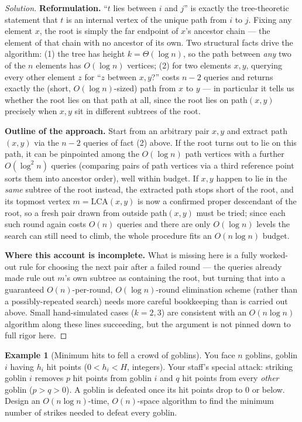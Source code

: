 \documentclass[11pt]{article}
\theoremstyle{definition}
\newtheorem{example}{Example}[section]
\begin{document}
\begin{proof}[Solution]
\textbf{Reformulation.} ``$t$ lies between $i$ and $j$'' is exactly the tree-theoretic statement that $t$ is an internal vertex of the unique path from $i$ to $j$. Fixing any element $x$, the root is simply the far endpoint of $x$'s ancestor chain — the element of that chain with no ancestor of its own. Two structural facts drive the algorithm: (1) the tree has height $k=\Theta(\log n)$, so the path between \emph{any} two of the $n$ elements has $O(\log n)$ vertices; (2) for two elements $x,y$, querying every other element $z$ for ``$z$ between $x,y$?'' costs $n-2$ queries and returns exactly the (short, $O(\log n)$-sized) path from $x$ to $y$ — in particular it tells us whether the root lies on that path at all, since the root lies on path$(x,y)$ precisely when $x,y$ sit in different subtrees of the root.

\textbf{Outline of the approach.} Start from an arbitrary pair $x,y$ and extract path$(x,y)$ via the $n-2$ queries of fact (2) above. If the root turns out to lie on this path, it can be pinpointed among the $O(\log n)$ path vertices with a further $O(\log^2 n)$ queries (comparing pairs of path vertices via a third reference point sorts them into ancestor order), well within budget. If $x,y$ happen to lie in the \emph{same} subtree of the root instead, the extracted path stops short of the root, and its topmost vertex $m=\mathrm{LCA}(x,y)$ is now a confirmed proper descendant of the root, so a fresh pair drawn from outside path$(x,y)$ must be tried; since each such round again costs $O(n)$ queries and there are only $O(\log n)$ levels the search can still need to climb, the whole procedure fits an $O(n\log n)$ budget.

\textbf{Where this account is incomplete.} What is missing here is a fully worked-out rule for choosing the next pair after a failed round — the queries already made rule out $m$'s own subtree as containing the root, but turning that into a guaranteed $O(n)$-per-round, $O(\log n)$-round elimination scheme (rather than a possibly-repeated search) needs more careful bookkeeping than is carried out above. Small hand-simulated cases ($k=2,3$) are consistent with an $O(n\log n)$ algorithm along these lines succeeding, but the argument is not pinned down to full rigor here.
\end{proof}

\begin{example}[Minimum hits to fell a crowd of goblins]
You face $n$ goblins, goblin $i$ having $h_i$ hit points ($0<h_i<H$, integers). Your staff's special attack: striking goblin $i$ removes $p$ hit points from goblin $i$ and $q$ hit points from every \emph{other} goblin ($p>q>0$). A goblin is defeated once its hit points drop to $0$ or below. Design an $O(n\log n)$-time, $O(n)$-space algorithm to find the minimum number of strikes needed to defeat every goblin.
\end{example}
\end{document}
